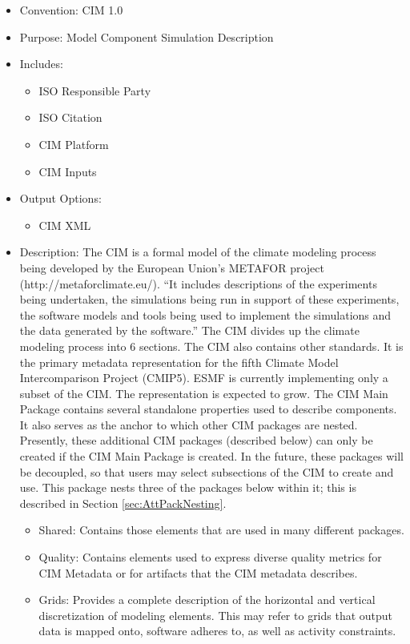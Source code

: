 \begin{itemize}
    \item Convention: CIM 1.0
    \item Purpose: Model Component Simulation Description
    \item Includes:
    \begin{itemize}
       \item ISO Responsible Party
       \item ISO Citation
       \item CIM Platform
       \item CIM Inputs
    \end{itemize}
    \item Output Options: 
    \begin{itemize}
        \item CIM XML
    \end{itemize}  
\item Description: The CIM is a formal model of the climate modeling process being developed by the European Union's METAFOR project (http://metaforclimate.eu/). ``It includes descriptions of the experiments being undertaken, the simulations being run in support of these experiments, the software models and tools being used to implement the simulations and the data generated by the software.'' The CIM divides up the climate modeling process into 6 sections. The CIM also contains other standards. It is the primary metadata representation for the fifth Climate Model Intercomparison Project (CMIP5). ESMF is currently implementing only a subset of the CIM. The representation is expected to grow. The CIM Main Package contains several standalone properties used to describe components. It also serves as the anchor to which other CIM packages are nested. Presently, these additional CIM packages (described below) can only be created if the CIM Main Package is created. In the future, these packages will be decoupled, so that users may select subsections of the CIM to create and use. This package nests three of the packages below within it; this is described in Section \ref{sec:AttPackNesting}.
    \begin{itemize}
       \item Shared: Contains those elements that are used in many different packages. 
       \item Quality: Contains elements used to express diverse quality metrics for CIM Metadata or for artifacts that the CIM metadata describes.
       \item Grids: Provides a complete description of the horizontal and vertical discretization of modeling elements. This may refer to grids that output data is mapped onto, software adheres to, as well as activity constraints. 

\end{itemize}
\end{itemize}
